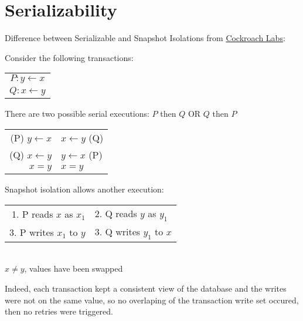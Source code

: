 \documentclass[a4paper, 10pt, titlepage]{report}
\begin{document}
\label{sec:serial}
\section{Serializability}
Difference between Serializable and Snapshot Isolations from \href{https://www.cockroachlabs.com/blog/what-write-skew-looks-like/}{Cockroach Labs}:


Consider the following transactions:
\begin{table}[H]
  \centering
  \begin{tabular}{ c }
    $P:   y \gets x$\\
    $Q:   x \gets y$\\
  \end{tabular}
\end{table}

There are two possible serial executions: $P$ then $Q$ OR $Q$ then $P$
\begin{table}[H]
  \centering
  \begin{tabular}{ r | l }
    (P) $y \gets x$ & $x \gets y$ (Q) \\
    (Q) $x \gets y$ & $y \gets x$ (P) \\
    $x = y$ & $x = y$ \\
  \end{tabular}
\end{table}

Snapshot isolation allows another execution:

\begin{table}[H]
  \centering
  \begin{tabular}{ r | l }
    1. P reads $x$ as $x_1$ & 2. Q reads $y$ as $y_1$ \\
    3. P writes $x_1$ to $y$ & 3. Q writes $y_1$ to $x$ \\
  \end{tabular}
  \\
  $x \neq y$, values have been swapped
\end{table}

Indeed, each transaction kept a consistent view of the database and the writes were not on the same value, so no overlaping of the transaction write set occured, then no retries were triggered.
\end{document}
